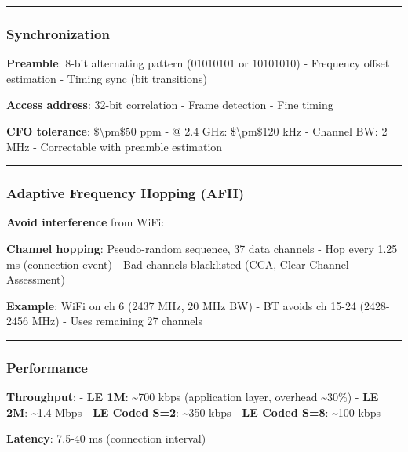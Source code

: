 \begin{center}\rule{0.5\linewidth}{0.5pt}\end{center}

\subsubsection{Synchronization}\label{synchronization-2}

\textbf{Preamble}: 8-bit alternating pattern (01010101 or 10101010) -
Frequency offset estimation - Timing sync (bit transitions)

\textbf{Access address}: 32-bit correlation - Frame detection - Fine
timing

\textbf{CFO tolerance}: \$\textbackslash pm\$50 ppm - @ 2.4 GHz:
\$\textbackslash pm\$120 kHz - Channel BW: 2 MHz - Correctable with
preamble estimation

\begin{center}\rule{0.5\linewidth}{0.5pt}\end{center}

\subsubsection{Adaptive Frequency Hopping
(AFH)}\label{adaptive-frequency-hopping-afh}

\textbf{Avoid interference} from WiFi:

\textbf{Channel hopping}: Pseudo-random sequence, 37 data channels - Hop
every 1.25 ms (connection event) - Bad channels blacklisted (CCA, Clear
Channel Assessment)

\textbf{Example}: WiFi on ch 6 (2437 MHz, 20 MHz BW) - BT avoids ch
15-24 (2428-2456 MHz) - Uses remaining 27 channels

\begin{center}\rule{0.5\linewidth}{0.5pt}\end{center}

\subsubsection{Performance}\label{performance-4}

\textbf{Throughput}: - \textbf{LE 1M}: \textasciitilde700 kbps
(application layer, overhead \textasciitilde30\%) - \textbf{LE 2M}:
\textasciitilde1.4 Mbps - \textbf{LE Coded S=2}: \textasciitilde350 kbps
- \textbf{LE Coded S=8}: \textasciitilde100 kbps

\textbf{Latency}: 7.5-40 ms (connection interval)

